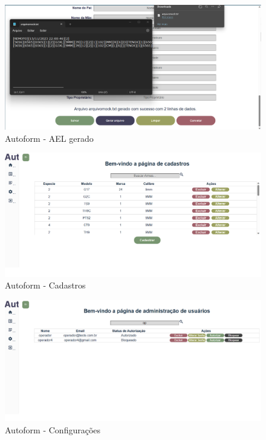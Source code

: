 \begin{figure}[htb]
    \caption{\label{fig:tela-ael-gerado}Autoform - AEL gerado}
    \begin{center}
        \includegraphics[scale=0.5]{imagens/autoform-ael-gerado.png}
    \end{center}
\end{figure}
\begin{figure}[htb]
    \caption{\label{fig:tela-cadastros-armas}Autoform - Cadastros}
    \begin{center}
        \includegraphics[scale=0.5]{imagens/autoform-cadastros.png}
    \end{center}
\end{figure}
\begin{figure}[htb]
    \caption{\label{fig:tela-configuracoes}Autoform - Configurações}
    \begin{center}
        \includegraphics[scale=0.5]{imagens/autoform-configuracoes.png}
    \end{center}
\end{figure}



